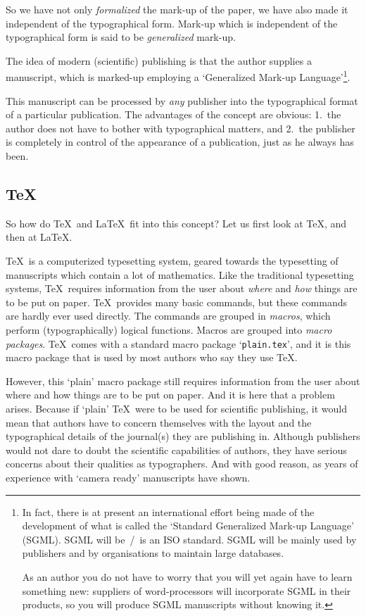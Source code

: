 So we have not only {\sl formalized\/} the mark-up of the paper, we
have also made it independent of the typographical form.
Mark-up which is independent of the typographical form is said to be
{\sl generalized\/} mark-up.

The idea of modern (scientific) publishing is that the author supplies
a manuscript, which is marked-up employing a `Generalized Mark-up
Language'\footnote{
 In fact, there is at present an international effort being made of
 the development of what is called the `Standard Generalized Mark-up
 Language' (SGML).
 SGML will be~/~is an ISO standard.
 SGML will be mainly used by publishers and by organisations to maintain
 large databases.

 As an author you do not have to worry that you will yet again have
 to learn something new: suppliers of word-processors will incorporate
 SGML in their products, so you will produce SGML manuscripts without
 knowing it.}.

This manuscript can be processed by {\em any\/} publisher into the
typographical format of a particular publication.
The advantages of the concept are obvious: 1.~the author does not
have to bother with typographical matters, and 2.~the publisher is
completely in control of the appearance of a publication, just as he
always has been.

\subsection{\TeX}

So how do \TeX\ and \LaTeX\ fit into this concept?
Let us first look at \TeX, and then at \LaTeX.

\TeX\ is a computerized typesetting system, geared towards the typesetting
of manuscripts which contain a lot of mathematics.
Like the traditional typesetting systems, \TeX\ requires information
from the user about {\sl where\/} and {\sl how\/} things are to be put on
paper.
\TeX\ provides many basic commands, but these commands are hardly ever
used directly.
The commands are grouped in {\sl macros}, which perform (typographically)
logical functions.
Macros are grouped into {\sl macro packages}.
\TeX\ comes with a standard macro package `{\tt plain.tex}', and it is this
macro package that is used by most authors who say they use \TeX.

However, this `plain' macro package still requires information from the
user about where and how things are to be put on paper.
And it is here that a problem arises.
Because if `plain' \TeX\ were to be used for scientific publishing, it
would mean that authors have to concern themselves with the layout and
the typographical details of the journal(s) they are publishing in.
Although publishers would not dare to doubt the scientific capabilities
of authors, they have serious concerns about their qualities as typographers.
And with good reason, as years of experience with `camera ready' manuscripts
have shown.

